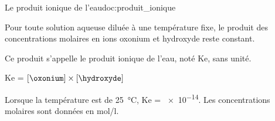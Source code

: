 \begin{doc}{Le produit ionique de l'eau}{doc:produit_ionique}
  \begin{importants}  
    Pour toute solution aqueuse diluée à une température fixe, le produit des concentrations molaires en ions oxonium \oxonium et hydroxyde \hydroxyde reste constant.
  \end{importants}
  
  Ce produit s’appelle le produit ionique de l’eau, noté Ke, sans unité.  
  \begin{center}
    Ke = $\left[ \oxonium \right] \times \left[ \hydroxyde \right]$
  \end{center}
  Lorsque la température est de \qty{25}{\degreeCelsius}, Ke = \num{e-14}.
  Les concentrations molaires sont données en \unit{\mole/\litre}.
\end{doc}


\newpage
{}



